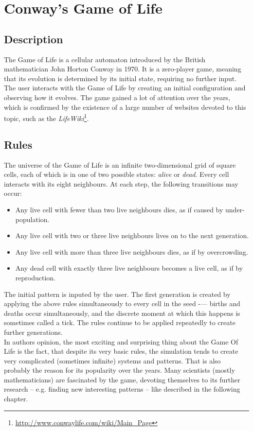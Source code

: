 \documentclass[11pt,a4paper]{article}
\begin{document}
\section{Conway's Game of Life}
\subsection{Description}
The Game of Life is a cellular automaton introduced by the British mathematician John Horton Conway in 1970. It is a zero-player game, meaning that its evolution is determined by its initial state, requiring no further input. The user interacts with the Game of Life by creating an initial configuration and observing how it evolves. The game gained a lot of attention over the years, which is confirmed by the existence of a large number of websites devoted to this topic, such as the \textit{LifeWiki}\footnote{\url{http://www.conwaylife.com/wiki/Main_Page}}.

\subsection{Rules}
The universe of the Game of Life is an infinite two-dimensional grid of square cells, each of which is in one of two possible states: \textit{alive} or \textit{dead}. Every cell interacts with its eight neighbours. At each step, the following transitions may occur:

\begin{itemize}
  \item Any live cell with fewer than two live neighbours dies, as if caused by under-population.
  \item Any live cell with two or three live neighbours lives on to the next generation.
  \item Any live cell with more than three live neighbours dies, as if by overcrowding.
  \item Any dead cell with exactly three live neighbours becomes a live cell, as if by reproduction.
\end{itemize}

The initial pattern is inputed by the user. The first generation is created by applying the above rules simultaneously to every cell in the seed -— births and deaths occur simultaneously, and the discrete moment at which this happens is sometimes called a tick. The rules continue to be applied repeatedly to create further generations.\\

In authors opinion, the most exciting and surprising thing about the Game Of Life is the fact, that despite its very basic rules, the simulation tends to create very complicated (sometimes infinite) systems and patterns. That is also probably the reason for its popularity over the years. Many scientists (mostly mathematicians) are fascinated by the game, devoting themselves to its further research -- e.g. finding new interesting patterns -- like described in the following chapter.
\end{document}
